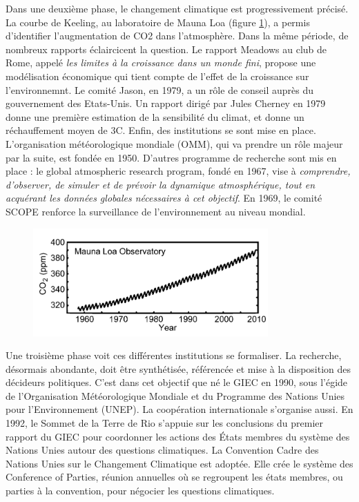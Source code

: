 Dans une deuxième phase, le changement climatique est progressivement précisé. La courbe de Keeling, au laboratoire de Mauna Loa (figure \ref{fig:keeling}), a permis d'identifier l'augmentation de CO2 dans l'atmosphère. Dans la même période, de nombreux rapports éclaircicent la question. Le rapport Meadows au club de Rome, appelé \emph{les limites à la croissance dans un monde fini}, propose une modélisation économique qui tient compte de l'effet de la croissance sur l'environnemnt. Le comité Jason, en 1979, a un rôle de conseil auprès du gouvernement des Etats-Unis. Un rapport dirigé par Jules Cherney en 1979 donne une première estimation de la sensibilité du climat, et donne un réchauffement moyen de 3\textdegree C. Enfin, des institutions se sont mise en place. L'organisation météorologique mondiale (OMM), qui va prendre un rôle majeur par la suite, est fondée en 1950. D'autres programme de recherche sont mis en place : le global atmospheric research program, fondé en 1967, vise à \emph{comprendre, d’observer, de simuler et de prévoir la dynamique atmosphérique, tout en acquérant les données globales nécessaires à cet objectif}. En 1969, le comité SCOPE renforce la surveillance de l'environnement au niveau mondial. 

\begin{figure}
    \centering

    \includegraphics[width=0.5\linewidth]{figures/keeling.png}

    \label{fig:keeling}
\end{figure}

Une troisième phase voit ces différentes institutions se formaliser. La recherche, désormais abondante, doit être synthétisée, référencée et mise à la disposition des décideurs politiques. C'est dans cet objectif que né le GIEC en 1990, sous l'égide de l'Organisation Météorologique Mondiale et du Programme des Nations Unies pour l'Environnement (UNEP). La coopération internationale s'organise aussi. En 1992, le Sommet de la Terre de Rio s'appuie sur les conclusions du premier rapport du GIEC pour coordonner les actions des États membres du système des Nations Unies autour des questions climatiques. La Convention Cadre des Nations Unies sur le Changement Climatique est adoptée. Elle crée le système des Conference of Parties, réunion annuelles où se regroupent les états membres, ou parties à la convention, pour négocier les questions climatiques.



